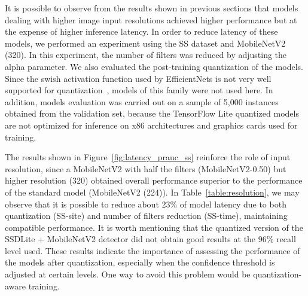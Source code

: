 It is possible to observe from the results shown in previous sections that models
dealing with higher image input resolutions achieved higher performance but at
the expense of higher inference latency. In order to reduce latency of these
models, we performed an experiment using the SS dataset and MobileNetV2 (320).
In this experiment, the number of filters was reduced by adjusting the alpha
parameter. We also evaluated the post-training quantization of the models.
Since the swish activation function used by EfficientNets is not very well
supported for quantization~\citep{xiong2020mobiledets}, models of this family
were not used here. In addition, models evaluation was carried out on a sample
of 5,000 instances obtained from the validation set, because the TensorFlow Lite
quantized models are not optimized for inference on x86 architectures and
graphics cards used for training.

The results shown in Figure~\ref{fig:latency_prauc_ss} reinforce the role of
input resolution, since a MobileNetV2 with half the filters (MobileNetV2-0.50)
but higher resolution (320) obtained overall performance superior to the
performance of the standard model (MobileNetV2 (224)). In
Table~\ref{table:resolution}, we may observe that it is possible to reduce
about 23\% of model latency due to both quantization (SS-site) and number of
filters reduction (SS-time), maintaining compatible performance. It is worth
mentioning that the quantized version of the SSDLite + MobileNetV2 detector did
not obtain good results at the 96\% recall level used. These results indicate
the importance of assessing the performance of the models after quantization,
especially when the confidence threshold is adjusted at certain levels. One way
to avoid this problem would be quantization-aware training.

